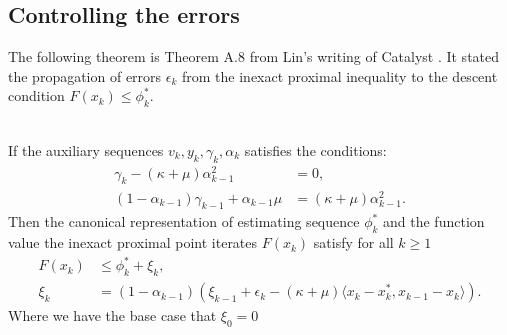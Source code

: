 \documentclass[12pt]{article}
\begin{document}
    \subsection{Controlling the errors}
        The following theorem is Theorem A.8 from Lin's writing of Catalyst \cite{lin_universal_2015}. 
        It stated the propagation of errors $\epsilon_k$ from the inexact proximal inequality to the descent condition $F(x_k) \le \phi_k^*$. 
        \begin{theorem}\;\\
            If the auxiliary sequences $v_k, y_k, \gamma_k, \alpha_k$ satisfies the conditions: 
            \begin{align*}
                \gamma_k - (\kappa + \mu)\alpha_{k - 1}^2 
                &= 0, 
                \\
                (1 - \alpha_{k - 1})\gamma_{k - 1} + \alpha_{k - 1}\mu 
                &= (\kappa + \mu)\alpha_{k - 1}^2. 
            \end{align*}
            Then the canonical representation of estimating sequence $\phi_k^*$ and the function value 
            the inexact proximal point iterates $F(x_k)$ satisfy for all $k\ge 1$
            \begin{align*}
                F(x_k) &\le \phi_k^* + \xi_k, 
                \\
                \xi_k &= 
                (1 - \alpha_{k - 1})(
                    \xi_{k - 1} + \epsilon_k 
                    - (\kappa + \mu)\langle x_k - x_k^*, x_{k - 1} - x_k\rangle
                ). 
            \end{align*}
            Where we have the base case that $\xi_0 = 0$
        \end{theorem}
\end{document}
